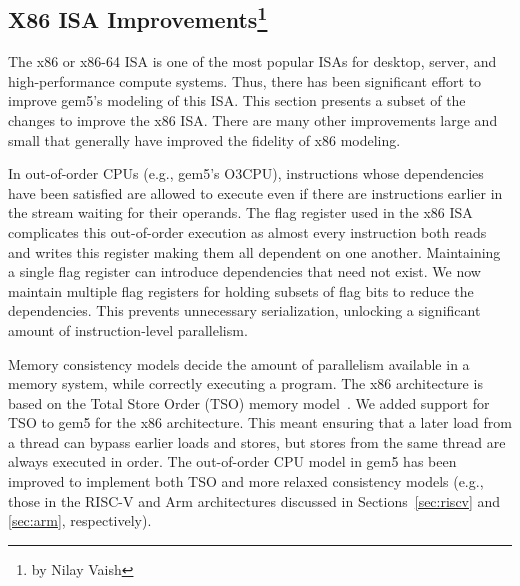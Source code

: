 \subsection[X86 ISA Improvements]{X86 ISA Improvements\footnote{by Nilay Vaish}}
\label{sec:x86}

The x86 or x86-64 ISA is one of the most popular ISAs for desktop, server, and high-performance compute systems.
Thus, there has been significant effort to improve gem5's modeling of this ISA.
This section presents a subset of the changes to improve the x86 ISA.
There are many other improvements large and small that generally have improved the fidelity of x86 modeling.

In out-of-order CPUs (e.g., gem5's O3CPU), instructions whose dependencies have been satisfied are allowed to execute even if there are instructions earlier in the stream waiting for their operands.
The flag register used in the x86 ISA complicates this out-of-order execution as almost every instruction both reads and writes this register making them all dependent on one another.
Maintaining a single flag register can introduce dependencies that need not exist.
We now maintain multiple flag registers for holding subsets of flag bits to reduce the dependencies.
This prevents unnecessary serialization, unlocking a significant amount of instruction-level parallelism.

Memory consistency models decide the amount of parallelism available in a memory system, while correctly executing a program.
The x86 architecture is based on the Total Store Order (TSO) memory model~\cite{NagarajanSorin2020-cohMCMPrimer}.
We added support for TSO to gem5 for the x86 architecture.
This meant ensuring that a later load from a thread can bypass earlier loads and stores, but stores from the same thread are always executed in order.
The out-of-order CPU model in gem5 has been improved to implement both TSO and more relaxed consistency models (e.g., those in the RISC-V and Arm architectures discussed in Sections~\ref{sec:riscv} and \ref{sec:arm}, respectively).
